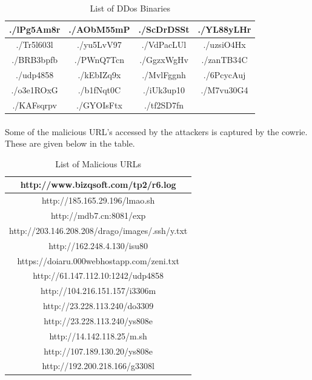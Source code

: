 \documentclass{report}
\begin{document}
\begin{table}[h!]
\begin{center}

\begin{tabular}{ |c|c|c|c| } 
 \hline
 ./lPg5Am8r & ./AObM55mP & ./ScDrDSSt & ./YL88yLHr\\
 \hline
 ./Tr5l603l & ./yu5LvV97 & ./VdPacLUl  & ./uzsiO4Hx \\
 \hline
 ./BRB3bpfb  & ./PWnQ7Tcn  & ./GgzxWgHv & ./zanTB34C  \\
 \hline
 ./udp4858 &  ./kEbIZq9x & ./MvlFggnh & ./6PcycAuj \\
 \hline
 ./o3e1ROxG  & ./b1fNqt0C & ./iUk3up10 & ./M7vu30G4 \\
 \hline
 ./KAFsqrpv & ./GYOIsFtx & ./tf2SD7fn &  \\
 \hline
\end{tabular}
\caption{List of DDos Binaries}
\end{center}
\end{table}

\paragraph{}
Some of the malicious URL's accessed by the attackers is captured by the cowrie. These are given below in the table.


\begin{table}[h!]
\begin{center}

\begin{tabular}{ |c| } 
 \hline
 http://www.bizqsoft.com/tp2/r6.log\\
 \hline
 http://185.165.29.196/lmao.sh\\
 \hline
 http://mdb7.cn:8081/exp  \\
 \hline
 http://203.146.208.208/drago/images/.ssh/y.txt \\
 \hline
 http://162.248.4.130/isu80 \\
 \hline
 https://doiaru.000webhostapp.com/zeni.txt  \\
 \hline
 http://61.147.112.10:1242/udp4858  \\
 \hline
 http://104.216.151.157/i3306m  \\
 \hline
  http://23.228.113.240/do3309  \\
 \hline
  http://23.228.113.240/ys808e  \\
 \hline
  http://14.142.118.25/m.sh  \\
 \hline
  http://107.189.130.20/ys808e  \\
 \hline
  http://192.200.218.166/g3308l  \\
 \hline
 
 
\end{tabular}
\caption{List of Malicious URLs}
\end{center}
\end{table}
\end{document}
